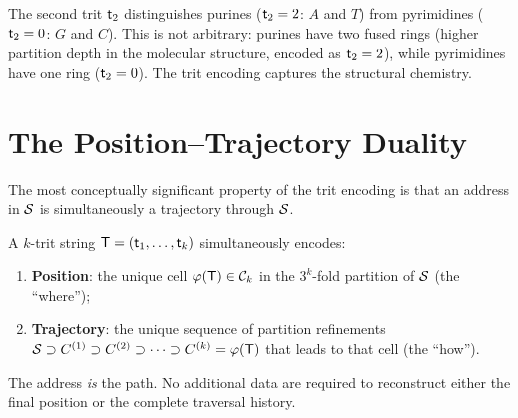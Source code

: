 \begin{remark}
The second trit $\mathsf{t}_2$ distinguishes purines ($\mathsf{t}_2 = 2$: $A$ and $T$)
from pyrimidines ($\mathsf{t}_2 = 0$: $G$ and $C$). This is not arbitrary: purines
have two fused rings (higher partition depth in the molecular structure, encoded
as $\mathsf{t}_2 = 2$), while pyrimidines have one ring ($\mathsf{t}_2 = 0$). The trit
encoding captures the structural chemistry.
\end{remark}

\section{The Position--Trajectory Duality}
\label{sec:position_trajectory}

The most conceptually significant property of the trit encoding is that an
address in $\mathcal{S}$ is simultaneously a trajectory through $\mathcal{S}$.

\begin{theorem}
\label{thm:pos_traj_duality}
A $k$-trit string $\mathsf{T} = (\mathsf{t}_1, \ldots, \mathsf{t}_k)$ simultaneously encodes:
\begin{enumerate}[label=(\roman*)]
  \item \textbf{Position}: the unique cell $\varphi(\mathsf{T}) \in \mathcal{C}_k$
        in the $3^k$-fold partition of $\mathcal{S}$ (the ``where'');
  \item \textbf{Trajectory}: the unique sequence of partition refinements
        $\mathcal{S} \supset C^{(1)} \supset C^{(2)} \supset \cdots \supset C^{(k)} = \varphi(\mathsf{T})$
        that leads to that cell (the ``how'').
\end{enumerate}
The address \emph{is} the path. No additional data are required to reconstruct
either the final position or the complete traversal history.
\end{theorem}

